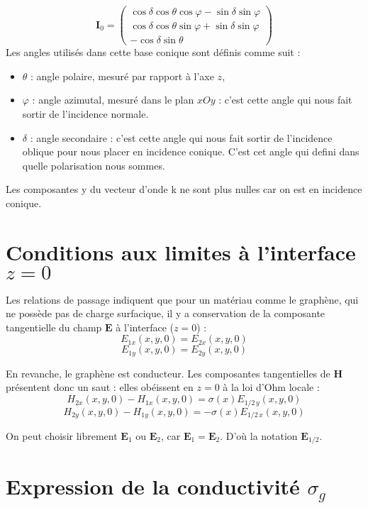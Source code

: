 \documentclass{article}
\begin{document}
\[
\mathbf{I}_0 = 
\begin{pmatrix}
\cos\delta \cos\theta \cos\varphi - \sin\delta \sin\varphi \\
\cos\delta \cos\theta \sin\varphi + \sin\delta \sin\varphi \\
-\cos\delta \sin\theta
\end{pmatrix}
\]
\noindent
Les angles utilisés dans cette base conique sont définis comme suit :
\begin{itemize}
  \item \( \theta \) : angle polaire, mesuré par rapport à l’axe \( z \),
  \item \( \varphi \) : angle azimutal, mesuré dans le plan \( xOy \) : c'est cette angle qui nous fait sortir de l'incidence normale.
  \item \( \delta \) : angle secondaire : c'est cette angle qui nous fait sortir de l'incidence oblique pour nous placer en incidence conique. C'est cet angle qui defini dans quelle polarisation nous sommes.
\end{itemize}

Les composantes y du vecteur d'onde k ne sont plus nulles car on est en incidence conique.


\section*{Conditions aux limites à l'interface $z = 0$}

Les relations de passage indiquent que pour un matériau comme le graphène, qui ne possède pas de charge surfacique, il y a conservation de la composante tangentielle du champ $\mathbf{E}$ à l'interface ($z = 0$) :
\[
E_{1x}(x, y, 0) = E_{2x}(x, y, 0)
\]
\[
E_{1y}(x, y, 0) = E_{2y}(x, y, 0)
\]

En revanche, le graphène est conducteur. Les composantes tangentielles de $\mathbf{H}$ présentent donc un saut : elles obéissent en $z = 0$ à la loi d'Ohm locale :
\[
H_{2x}(x, y, 0) - H_{1x}(x, y, 0) = \sigma(x) E_{1/2\, y}(x, y, 0)
\]
\[
H_{2y}(x, y, 0) - H_{1y}(x, y, 0) = -\sigma(x)  E_{1/2\, x}(x, y, 0)
\]

On peut choisir librement $\mathbf{E}_1$ ou $\mathbf{E}_2$, car $\mathbf{E}_1 = \mathbf{E}_2$. D'où la notation $\mathbf{E}_{1/2}$.

\section*{Expression de la conductivité \( \sigma_g \)}
\end{document}
